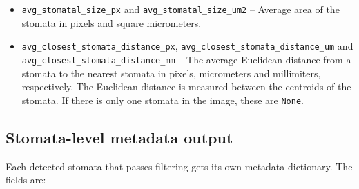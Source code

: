 \documentclass{article}
\begin{document}
\begin{itemize}
    \item \texttt{avg\_stomatal\_size\_px} and \texttt{avg\_stomatal\_size\_um2} -- Average area of the stomata in pixels and square micrometers.
    
    \item \texttt{avg\_closest\_stomata\_distance\_px}, \texttt{avg\_closest\_stomata\_distance\_um} and \texttt{avg\_closest\_stomata\_distance\_mm} -- The average Euclidean distance from a stomata to the nearest stomata in pixels, micrometers and millimiters, respectively. The Euclidean distance is measured between the centroids of the stomata. If there is only one stomata in the image, these are \texttt{None}.  
\end{itemize}

\subsection{Stomata-level metadata output}

Each detected stomata that passes filtering gets its own metadata dictionary. The fields are:
\end{document}
